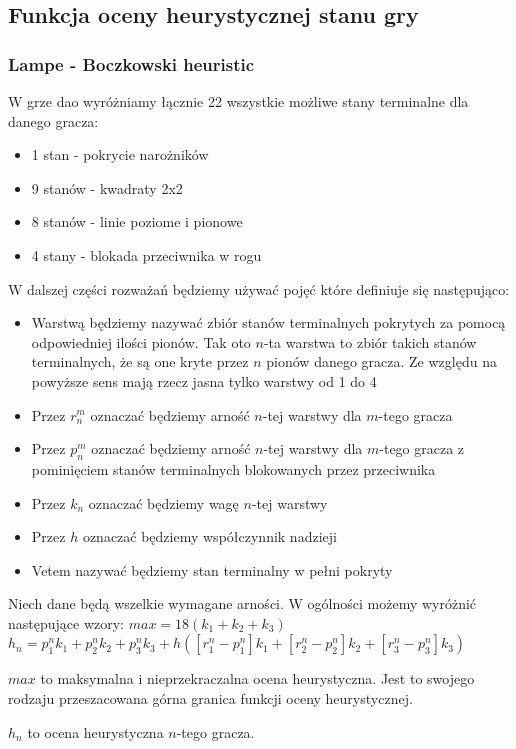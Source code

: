 \documentclass{scrartcl}
\begin{document}
\subsection{Funkcja oceny heurystycznej stanu gry}
\subsubsection{Lampe - Boczkowski heuristic}
W grze dao wyróżniamy łącznie 22 wszystkie możliwe stany terminalne dla danego gracza:
\begin{itemize}
\item 1 stan - pokrycie narożników
\item 9 stanów - kwadraty 2x2
\item 8 stanów - linie poziome i pionowe
\item 4 stany - blokada przeciwnika w rogu
\end{itemize}
W dalszej części rozważań będziemy używać pojęć które definiuje się następująco:
\begin{itemize}
\item Warstwą będziemy nazywać zbiór stanów terminalnych pokrytych za pomocą odpowiedniej ilości pionów. Tak oto $n$-ta warstwa to zbiór takich stanów terminalnych, że są one kryte przez $n$ pionów danego gracza. Ze względu na powyższe sens mają rzecz jasna tylko warstwy od 1 do 4
\item Przez $r_{n}^{m}$ oznaczać będziemy arność $n$-tej warstwy dla $m$-tego gracza
\item Przez $p_{n}^{m}$ oznaczać będziemy arność $n$-tej warstwy dla $m$-tego gracza z pominięciem stanów terminalnych blokowanych przez przeciwnika
\item Przez $k_{n}$ oznaczać będziemy wagę $n$-tej warstwy
\item Przez $h$ oznaczać będziemy współczynnik nadzieji
\item Vetem nazywać będziemy stan terminalny w pełni pokryty
\end{itemize}
Niech dane będą wszelkie wymagane arności. W ogólności możemy wyróżnić następujące wzory:
$max = 18 ( k_{1} + k_{2} + k_{3} )$
$h_{n} = p_{1}^{n} k_{1} + p_{2}^{n} k_{2} + p_{3}^{n} k_{3} + h ([r_{1}^{n} - p_{1}^{n}] k_{1} + [r_{2}^{n} - p_{2}^{n}] k_{2} + [r_{3}^{n} - p_{3}^{n}] k_{3})$

$max$ to maksymalna i nieprzekraczalna ocena heurystyczna. Jest to swojego rodzaju przeszacowana górna granica funkcji oceny heurystycznej.

$h_{n}$ to ocena heurystyczna $n$-tego gracza.
\end{document}
